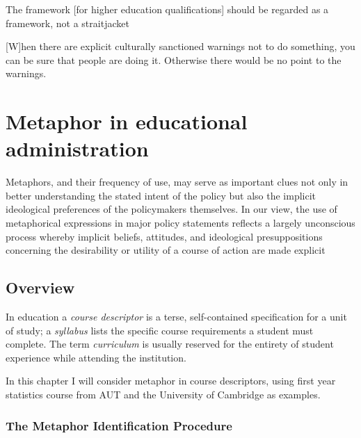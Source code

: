 \begin{singlespace}
\begin{savequote}[105mm]
The framework [for higher education qualifications] should be regarded
as a framework, not a straitjacket

[W]hen there are explicit culturally sanctioned warnings not to do
something, you can be sure that people are doing it.  Otherwise there
would be no point to the warnings.
\end{savequote}
\end{singlespace}

\chapter{Metaphor in educational administration}
\label{chapter3}

\begin{singlespace}
\setlength{\epigraphwidth}{.7\textwidth} %
\epigraph{Metaphors, and their frequency of use, may serve as
  important clues not only in better understanding the stated intent
  of the policy but also the implicit ideological preferences of the
  policymakers themselves.  In our view, the use of metaphorical
  expressions in major policy statements reflects a largely
  unconscious process whereby implicit beliefs, attitudes, and
  ideological presuppositions concerning the desirability or utility
  of a course of action are made explicit}{}
\end{singlespace}

\section{Overview}

In education a \emph{course descriptor} is a terse, self-contained
specification for a unit of study; a \emph{syllabus} lists the
specific course requirements a student must complete.  The term
\emph{curriculum} is usually reserved for the entirety of student
experience while attending the institution.

In this chapter I will consider metaphor in course descriptors, using
first year statistics course from AUT and the University of Cambridge
as examples.

\subsection{The Metaphor Identification Procedure}

